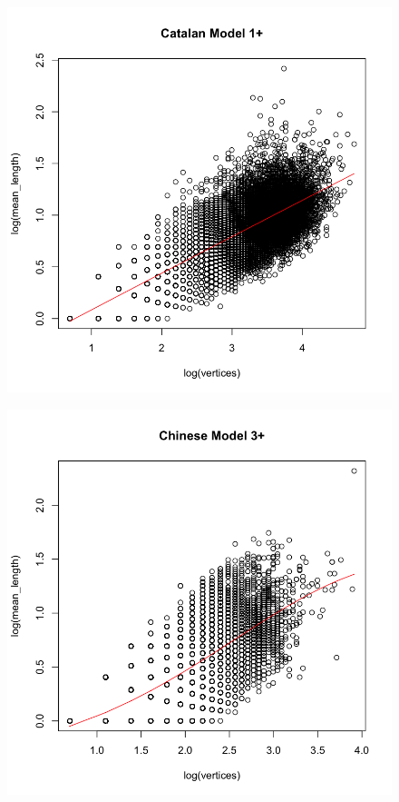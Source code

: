 \documentclass[paper=a4, fontsize=11pt]{scrartcl} %
\begin{document}
\begin{figure}
\begin{minipage}{.5\textwidth}
  \label{fig:2}
\end{minipage}
\end{figure}

\begin{figure}
\centering
\begin{minipage}{.5\textwidth}
  \centering
  \includegraphics[width=\linewidth]{bestModel_Catalan.png}
  \label{fig:3}
\end{minipage}%
\begin{minipage}{.5\textwidth}
  \centering
  \includegraphics[width=\linewidth]{bestModel_Chinese.png}

\end{minipage}
\end{figure}
\end{document}

